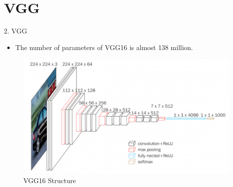 \documentclass{beamer}
\begin{document}
\section{VGG}
\begin{frame}{2. VGG}
	\vspace{10pt}
	\begin{itemize}
		\item The number of parameters of VGG16\cite{vgg} is almost 138 million.
	\end{itemize}
	\vspace{10pt}
	\begin{figure}[h]		
		\centering
		\includegraphics[scale=0.5]{./vgg/VGG_2.PNG}
		\caption{VGG16 Structure}
		\label{VGG16}
	\end{figure}
\end{frame}
\end{document}
